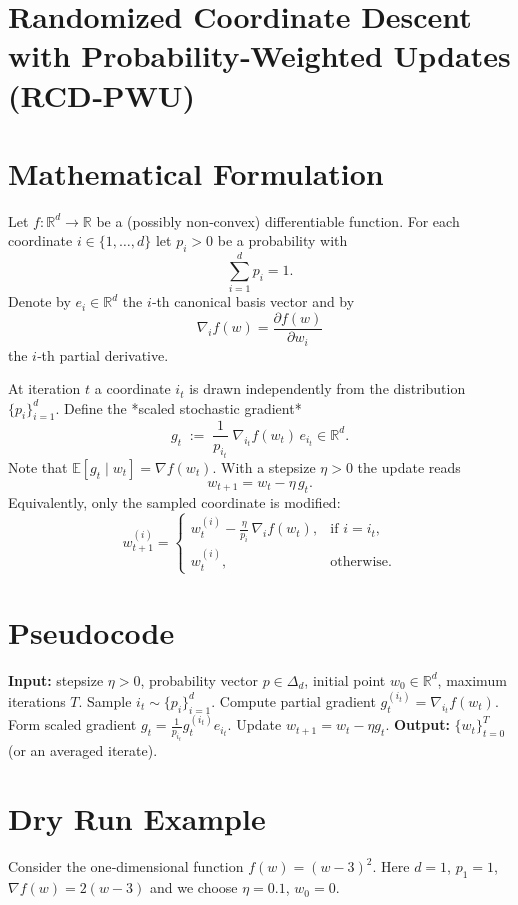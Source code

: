 \documentclass[11pt]{article}
\newcommand{\E}{\mathbb{E}}
\newcommand{\R}{\mathbb{R}}
\begin{document}
\section*{Randomized Coordinate Descent with Probability‑Weighted Updates (RCD‑PWU)}

\section*{Mathematical Formulation}
Let $f:\R^{d}\rightarrow\R$ be a (possibly non‑convex) differentiable function.  
For each coordinate $i\in\{1,\dots ,d\}$ let $p_i>0$ be a probability with
\[
\sum_{i=1}^{d}p_i=1 .
\]
Denote by $e_i\in\R^{d}$ the $i$‑th canonical basis vector and by
\[
\nabla_i f(w)=\frac{\partial f(w)}{\partial w_i}
\]
the $i$‑th partial derivative.  

At iteration $t$ a coordinate $i_t$ is drawn independently from the
distribution $\{p_i\}_{i=1}^{d}$.  Define the *scaled stochastic gradient*
\[
g_t \;:=\; \frac{1}{p_{i_t}}\; \nabla_{i_t} f(w_t)\, e_{i_t}\in\R^{d}.
\tag{1}
\]
Note that $\E[g_t\mid w_t]=\nabla f(w_t)$.  
With a stepsize $\eta>0$ the update reads
\[
w_{t+1}=w_t-\eta\, g_t .
\tag{2}
\]
Equivalently, only the sampled coordinate is modified:
\[
w_{t+1}^{(i)}=
\begin{cases}
w_t^{(i)}-\displaystyle\frac{\eta}{p_i}\,\nabla_i f(w_t), &\text{if }i=i_t,\\[1ex]
w_t^{(i)}, &\text{otherwise.}
\end{cases}
\tag{3}
\]

\section*{Pseudocode}
\begin{algorithm}[H]
\caption{RCD‑PWU}
\begin{algorithmic}[1]
\STATE \textbf{Input:} stepsize $\eta>0$, probability vector $p\in\Delta_{d}$,
initial point $w_0\in\R^{d}$, maximum iterations $T$.
    \STATE Sample $i_t\sim\{p_i\}_{i=1}^{d}$.
    \STATE Compute partial gradient $g_{t}^{(i_t)}=\nabla_{i_t}f(w_t)$.
    \STATE Form scaled gradient $g_t=\frac{1}{p_{i_t}} g_{t}^{(i_t)}e_{i_t}$.
    \STATE Update $w_{t+1}=w_t-\eta g_t$.
\ENDFOR
\STATE \textbf{Output:} $\{w_t\}_{t=0}^{T}$ (or an averaged iterate).
\end{algorithmic}
\end{algorithm}

\section*{Dry Run Example}
Consider the one‑dimensional function $f(w)=(w-3)^2$.
Here $d=1$, $p_1=1$, $\nabla f(w)=2(w-3)$ and we choose $\eta=0.1$,
$w_0=0$.
\end{document}

